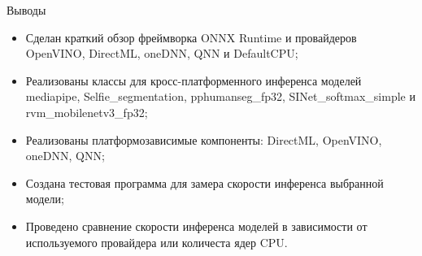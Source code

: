 \documentclass[aspectratio=169,xcolor=dvipsnames]{beamer}
\begin{document}
\begin{frame}{Выводы}
    \begin{itemize}
        \item Сделан краткий обзор фреймворка ONNX Runtime и провайдеров OpenVINO, DirectML, oneDNN, QNN и DefaultCPU;
        \item Реализованы классы для кросс-платформенного инференса моделей mediapipe, Selfie\_segmentation, pphumanseg\_fp32, SINet\_softmax\_simple и rvm\_mobilenetv3\_fp32;
        \item Реализованы платформозависимые компоненты: DirectML, OpenVINO, oneDNN, QNN;
        \item Создана тестовая программа для замера скорости инференса выбранной модели;
        \item Проведено сравнение скорости инференса моделей в зависимости от используемого провайдера или количеста ядер CPU.
    \end{itemize}
\end{frame}

\end{document}
